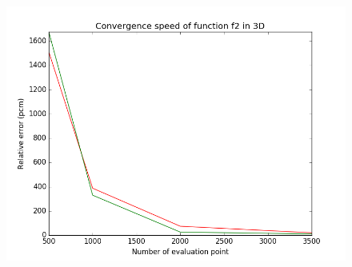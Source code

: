 \begin{figure}[h]
\begin{minipage}[b]{0.32\linewidth}
      \centering \includegraphics[scale=0.3]{images/f2_3d.png}
   \end{minipage}
\end{figure}
